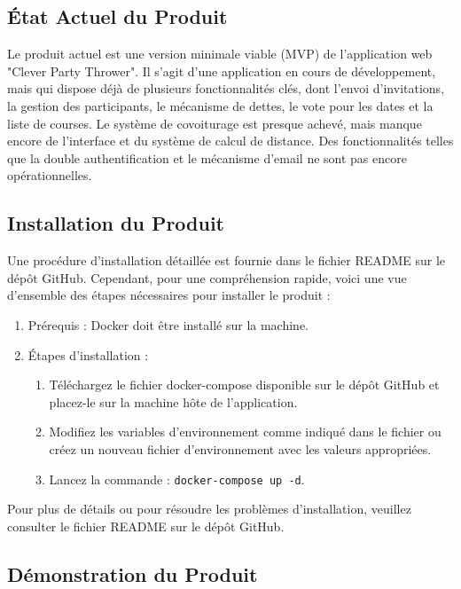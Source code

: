 \subsection{État Actuel du Produit}\label{subsec:etat-actuel-du-produit}

Le produit actuel est une version minimale viable (MVP) de l'application web "Clever Party Thrower".
Il s'agit d'une application en cours de développement, mais qui dispose déjà de plusieurs fonctionnalités clés, dont l'envoi d'invitations,
la gestion des participants, le mécanisme de dettes, le vote pour les dates et la liste de courses.
Le système de covoiturage est presque achevé, mais manque encore de l'interface et du système de calcul de distance.
Des fonctionnalités telles que la double authentification et le mécanisme d'email ne sont pas encore opérationnelles.

\subsection{Installation du Produit}\label{subsec:installation-du-produit}

Une procédure d'installation détaillée est fournie dans le fichier README sur le dépôt GitHub.
Cependant, pour une compréhension rapide,
voici une vue d'ensemble des étapes nécessaires pour installer le produit :

\begin{enumerate}
    \item Prérequis : Docker doit être installé sur la machine.
    \item Étapes d'installation :
    \begin{enumerate}
        \item Téléchargez le fichier docker-compose disponible sur le dépôt GitHub et placez-le sur la machine hôte de l'application.
        \item Modifiez les variables d'environnement comme indiqué dans le fichier ou créez un nouveau fichier d'environnement avec les valeurs appropriées.
        \item Lancez la commande : \texttt{docker-compose up -d}.
    \end{enumerate}
\end{enumerate}

Pour plus de détails ou pour résoudre les problèmes d'installation, veuillez consulter le fichier README sur le dépôt GitHub.

\subsection{Démonstration du Produit}\label{subsec:demonstration-du-produit}

